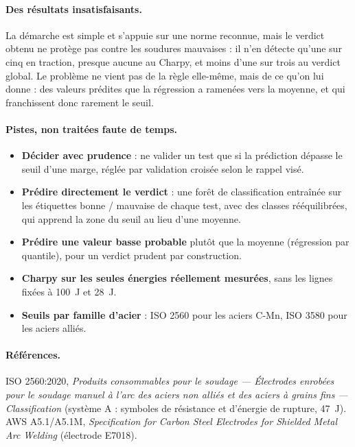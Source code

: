 \paragraph{Des résultats insatisfaisants.} La démarche est simple et s'appuie sur une
norme reconnue, mais le verdict obtenu ne protège pas contre les soudures mauvaises : il
n'en détecte qu'une sur cinq en traction, presque aucune au Charpy, et moins d'une sur
trois au verdict global. Le problème ne vient pas de la règle elle-même, mais de ce
qu'on lui donne : des valeurs prédites que la régression a ramenées vers la moyenne, et
qui franchissent donc rarement le seuil.

\paragraph{Pistes, non traitées faute de temps.}
\begin{itemize}
  \item \textbf{Décider avec prudence} : ne valider un test que si la prédiction dépasse
    le seuil d'une marge, réglée par validation croisée selon le rappel visé.
  \item \textbf{Prédire directement le verdict} : une forêt de classification entraînée
    sur les étiquettes bonne / mauvaise de chaque test, avec des classes rééquilibrées,
    qui apprend la zone du seuil au lieu d'une moyenne.
  \item \textbf{Prédire une valeur basse probable} plutôt que la moyenne (régression par
    quantile), pour un verdict prudent par construction.
  \item \textbf{Charpy sur les seules énergies réellement mesurées}, sans les lignes
    fixées à \SI{100}{\joule} et \SI{28}{\joule}.
  \item \textbf{Seuils par famille d'acier} : ISO 2560 pour les aciers C-Mn, ISO 3580
    pour les aciers alliés.
\end{itemize}

\paragraph{Références.} ISO 2560:2020, \emph{Produits consommables pour le soudage —
Électrodes enrobées pour le soudage manuel à l'arc des aciers non alliés et des aciers à
grains fins — Classification} (système A : symboles de résistance et d'énergie de
rupture, \SI{47}{\joule}). AWS A5.1/A5.1M, \emph{Specification for Carbon Steel
Electrodes for Shielded Metal Arc Welding} (électrode E7018).
